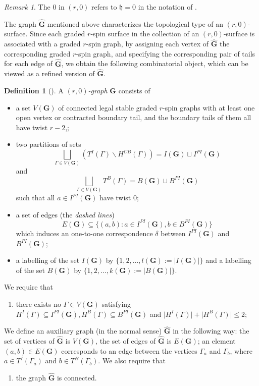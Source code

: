 \documentclass[11pt]{amsart}
\theoremstyle{definition}
\newtheorem{dfn}[dummy]{Definition}
\theoremstyle{remark}
\newtheorem{rmk}[dummy]{Remark}
\newcommand{\<}{\left<}
\renewcommand{\>}{\right>}
\numberwithin{equation}{section}
\def\h{{\mathfrak h}}
\begin{document}
\begin{rmk}
    The $0$ in $(r,0)$ refers to $\h=0$ in the notation of \cite{TZ1,TZ2}.
\end{rmk}



The graph $\hat{\mathbf{G}}$ mentioned above characterizes the topological type of an $(r,0)$-surface. Since each graded $r$-spin surface in the collection of an $(r,0)$-surface is associated with a graded $r$-spin graph, by assigning each vertex of $\hat{\mathbf{G}}$ the corresponding graded $r$-spin graph, and specifying the corresponding pair of tails for each edge of $\hat{\mathbf{G}}$, we obtain the following combinatorial object, which can be viewed as a refined version of $\hat{\mathbf{G}}$.
\begin{dfn}[{\cite[Definition 4.7]{TZ1}}]\label{def rh graphs}
A \textit{$(r,0)$-graph}  $\mathbf{G}$ consists of 
\begin{itemize} 
    \item a set $V(\mathbf{G})$ of connected legal stable graded $r$-spin graphs with at least one open vertex or contracted boundary tail, and the boundary tails of them all have twist $r-2$,;
    \item two partitions of sets
    $$
    \bigsqcup_{\Gamma\in V(\mathbf{G})}\left(T^I(\Gamma)\backslash H^{CB}(\Gamma)\right)=I(\mathbf{G})\sqcup I^{PI}(\mathbf{G})
    $$
    and
    $$
    \bigsqcup_{\Gamma\in V(\mathbf{G})}T^B(\Gamma)=B(\mathbf{G})\sqcup B^{PI}(\mathbf{G})
    $$
    such that all $a\in I^{PI}(\bm{G})$ have twist $0$;
    \item a set of edges (the \textit{dashed lines}) $$E(\mathbf{G})\subseteq \{(a,b)\colon a\in I^{PI}(\mathbf{G}),b\in B^{PI}(\mathbf{G})\}$$ which induces an one-to-one correspondence $\delta$ between $I^{PI}(\mathbf{G})$ and $B^{PI}(\mathbf{G})$;
    \item a labelling of the set $I(\mathbf{G})$ by $\{1,2,\dots,l(\mathbf{G}):=\lvert I(\mathbf{G})\rvert\}$ and a labelling of the set $B(\mathbf{G})$ by $\{1,2,\dots,k(\mathbf{G}):=\lvert B(\mathbf{G})\rvert\}$.
\end{itemize}
    We require that 
    \begin{enumerate}
        \item there exists no $\Gamma\in V(\mathbf{G})$ satisfying 
    $
    H^I(\Gamma)\subseteq I^{PI}(\mathbf{G}), H^B(\Gamma)\subseteq B^{PI}(\mathbf{G})$ 
    and $
         \lvert H^I(\Gamma)\rvert+\lvert H^B(\Gamma)\rvert \le 2;
    $
    \end{enumerate}
    We define an auxiliary graph (in the normal sense) $\hat{\mathbf{G}}$ in the following way: the set of vertices of $\hat{\mathbf{G}}$ is $V(\mathbf{G})$, the set of edges of $\hat{\mathbf{G}}$ is $E(\mathbf{G})$; an element $(a,b)\in E(\mathbf{G})$ corresponds  to an edge between the vertices $\Gamma_a$ and $\Gamma_b$, where  $a\in T^I(\Gamma_a)$ and $b\in T^B(\Gamma_b)$. We also require that
\begin{enumerate}[resume*]
    \item  the graph $\hat{\mathbf{G}}$ is connected.
\end{enumerate}


\end{dfn}
\end{document}

